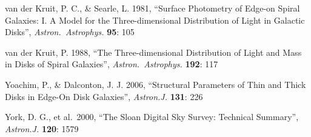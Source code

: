 \documentclass[10pt,a4paper,article]{memoir}
\begin{document}
\begin{thebibliography}{}
 van der Kruit, P. C., \&
Searle, L. 1981, ``Surface Photometry of Edge-on Spiral Galaxies: I. A
Model for the Three-dimensional Distribution of Light in Galactic
Disks'', \textit{Astron.\ Astrophys.} \textbf{95}: 105

 van der Kruit, P. 1988, ``The
Three-dimensional Distribution of Light and Mass in Disks of Spiral
Galaxies'', \textit{Astron.\ Astrophys.} \textbf{192}: 117

 Yoachim, P., \& Dalconton, J. J.
2006, ``Structural Parameters of Thin and Thick Disks in Edge-On Disk
Galaxies'', \textit{Astron.J.} \textbf{131}: 226

 York, D. G., et al.\ 2000, ``The Sloan Digital 
Sky Survey: Technical Summary'', \textit{Astron.J.} \textbf{120}: 1579


\end{thebibliography}
%
\end{document}
